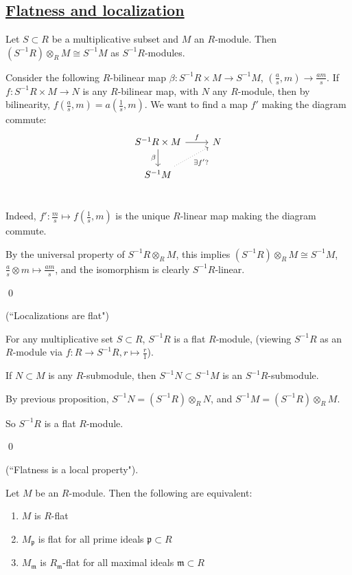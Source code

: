 \documentclass[x11names,reqno,14pt]{extarticle}
\newcommand{\mk}[1]{\mathfrak{#1}}
\begin{document}
\subsection*{\underline{Flatness and localization}}

\prop 

Let $S \subset R$ be a multiplicative subset and $M$ an $R$-module. Then $(S^{-1}R)\otimes_RM\cong S^{-1}M$ as $S^{-1}R$-modules. 

\proof

Consider the following $R$-bilinear map $\beta:S^{-1}R\times M \to S^{-1}M$, $(\frac{a}{s}, m) \to \frac{am}{s}$. If $f:S^{-1}R\times M \to N$ is any $R$-bilinear map, with $N$ any $R$-module, then by bilinearity, $f(\frac{a}{s}, m) = a(\frac{1}{s}, m)$. We want to find a map $f'$ making the diagram commute:
\[
\begin{tikzcd}
S^{-1}R\times M \ar[r, "f"] \ar[d,"\beta"']& N \\
S^{-1}M \ar[ur, dotted, "\exists f' ?"'] \\
\end{tikzcd}
\]

Indeed, $f':\frac{m}{s} \mapsto f(\frac{1}{s}, m)$ is the unique $R$-linear map making the diagram commute. 

By the universal property of $S^{-1}R\otimes_RM$, this implies $(S^{-1}R)\otimes_RM \cong S^{-1}M$, $\frac{a}{s}\otimes m \mapsto \frac{am}{s}$, and the isomorphism is clearly $S^{-1}R$-linear.

\qed

\cor (``Localizations are flat")

For any multiplicative set $S \subset R$, $S^{-1}R$ is a flat $R$-module, (viewing $S^{-1}R$ as an $R$-module via $f:R\to S^{-1}R, r \mapsto \frac{r}{1}$).

\proof

If $N \subset M$ is any $R$-submodule, then $S^{-1}N \subset S^{-1}M$ is an $S^{-1}R$-submodule. 

By previous proposition, $S^{-1}N = (S^{-1}R)\otimes_RN$, and $S^{-1}M = (S^{-1}R)\otimes_RM$. 

So $S^{-1}R$ is a flat $R$-module. 

\qed

\prop (``Flatness is a local property").

Let $M$ be an $R$-module. Then the following are equivalent: 

\begin{enumerate}

\item $M$ is $R$-flat 

\item $M_{\mk{p}}$ is flat for all prime ideals $\mk{p}\subset R$

\item $M_{\mk{m}}$ is $R_{\mk{m}}$-flat for all maximal ideals $\mk{m}\subset R$

\end{enumerate}
\end{document}
